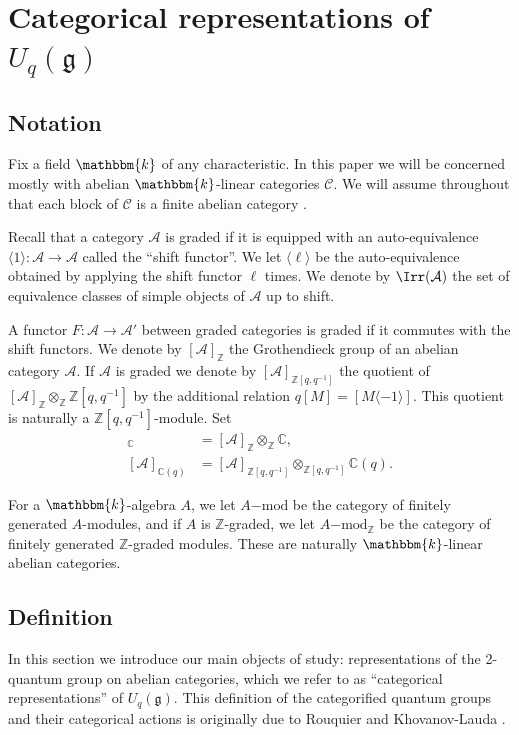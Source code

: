\documentclass[11pt,reqno]{amsart}
\numberwithin{equation}{section}
\theoremstyle{definition}
\theoremstyle{named}
\newcommand{\cA}{\mathcal{A}}
\newcommand{\cC}{\mathcal{C}}
\newcommand{\fg}{\mathfrak{g}}
\newcommand{\kk}{\mathbbm{k}}
\newcommand{\CC}{\mathbb{C}}
\newcommand{\ZZ}{\mathbb{Z}}
\newcommand{\todo}[1]{\textcolor{blue}{$[\star$ To do: #1 $\star]$}}
\newcommand{\iva}[1]{\textcolor{red}{$[\star$ Iva: #1 $\star]$}}
\newcommand{\mmod}{\mathrm{-mod}}
\begin{document}
\section{Categorical representations of $U_q(\fg)$}
%
\subsection{Notation}
Fix a field $\kk$ of any characteristic. In this paper we will be concerned mostly with abelian $\kk$-linear categories $\cC$.  We will assume throughout that each block of $\cC$ is a finite abelian category \cite[Definition 1.8.6]{EGNO}.


Recall that a category $\cA$ is graded  if it is equipped with an auto-equivalence $\langle 1 \rangle :\cA \to \cA$ called the ``shift functor''.   We let $\langle \ell \rangle$ be the auto-equivalence obtained by applying the shift functor $\ell$ times.  We denote by $\Irr(\cA)$ the set of equivalence classes of simple objects of $\cA$ up to shift.  
 
A functor $F:\cA \to \cA'$ between graded categories is graded if it commutes with the shift functors. We denote by $[\cA]_\ZZ$ the Grothendieck group of an abelian  category $\cA$.  If $\cA$ is graded we denote by $[\cA]_{\ZZ[q,q^{-1}]}$ the quotient of $[\cA]_\ZZ \otimes_\ZZ \ZZ[q,q^{-1}]$ by the additional relation $q[M]=[M\langle-1\rangle]$. This quotient is naturally a $\ZZ[q,q^{-1}]$-module. Set 
\begin{align*}
[\cA]_\CC &=[\cA]_\ZZ\otimes_{\ZZ}\CC, \\
[\cA]_{\CC(q)} &=[\cA]_{\ZZ[q,q^{-1}]}\otimes_{\ZZ[q,q^{-1}]}\CC(q).
\end{align*}

For a $\kk$-algebra $A$, we let $A\mmod$ be the category of finitely generated $A$-modules, and if $A$ is $\ZZ$-graded, we let $A\mmod_\ZZ$ be the category of finitely generated $\ZZ$-graded modules.  These are naturally $\kk$-linear abelian categories.  

\subsection{Definition}
In this section we introduce our main objects of study: representations of the 2-quantum group on abelian categories, which we refer to as “categorical representations” of $U_q(\fg)$.  This definition of the categorified quantum groups and their categorical actions is originally due to Rouquier and Khovanov-Lauda \cite{Rou2KM, KLI,KLII}.  
\end{document}
